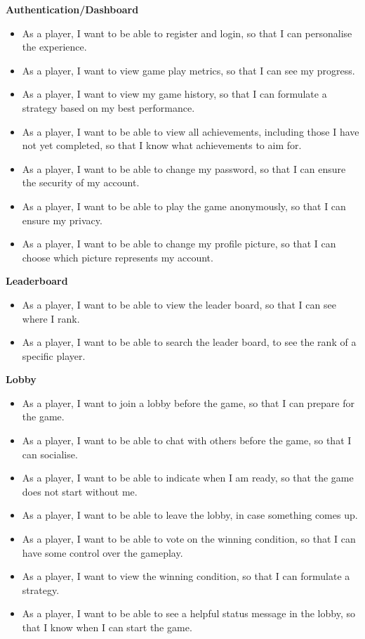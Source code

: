 \documentclass{l4proj}
\begin{document}
\textbf{Authentication/Dashboard}
\begin{itemize}
    \item As a player, I want to be able to register and login, so that I can personalise the experience.
    \item As a player, I want to view game play metrics, so that I can see my progress.
    \item As a player, I want to view my game history, so that I can formulate a strategy based on my best performance.
    \item As a player, I want to be able to view all achievements, including those I have not yet completed, so that I know what achievements to aim for.
    \item As a player, I want to be able to change my password, so that I can ensure the security of my account.
    \item As a player, I want to be able to play the game anonymously, so that I can ensure my privacy.
    \item As a player, I want to be able to change my profile picture, so that I can choose which picture represents my account.
\end{itemize}

\textbf{Leaderboard}
\begin{itemize}
    \item As a player, I want to be able to view the leader board, so that I can see where I rank.
    \item As a player, I want to be able to search the leader board, to see the rank of a specific player.
\end{itemize}

\textbf{Lobby}
\begin{itemize}
    \item As a player, I want to join a lobby before the game, so that I can prepare for the game.
    \item As a player, I want to be able to chat with others before the game, so that I can socialise.
    \item As a player, I want to be able to indicate when I am ready, so that the game does not start without me.
    \item As a player, I want to be able to leave the lobby, in case something comes up.
    \item As a player, I want to be able to vote on the winning condition, so that I can have some control over the gameplay.
    \item As a player, I want to view the winning condition, so that I can formulate a strategy.
    \item As a player, I want to be able to see a helpful status message in the lobby, so that I know when I can start the game.
\end{itemize}
\end{document}
